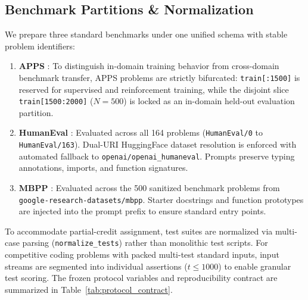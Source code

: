 \documentclass[letterpaper]{article} %
\begin{document}
\subsection{Benchmark Partitions \& Normalization}
We prepare three standard benchmarks under one unified schema with stable problem identifiers:
\begin{enumerate}
    \item \textbf{APPS} \citep{hendrycks2021apps}: To distinguish in-domain training behavior from cross-domain benchmark transfer, APPS problems are strictly bifurcated: \texttt{train[:1500]} is reserved for supervised and reinforcement training, while the disjoint slice \texttt{train[1500:2000]} ($N=500$) is locked as an in-domain held-out evaluation partition.
    \item \textbf{HumanEval} \citep{chen2021codex}: Evaluated across all 164 problems (\texttt{HumanEval/0} to \texttt{HumanEval/163}). Dual-URI HuggingFace dataset resolution is enforced with automated fallback to \texttt{openai/openai\_humaneval}. Prompts preserve typing annotations, imports, and function signatures.
    \item \textbf{MBPP} \citep{austin2021mbpp}: Evaluated across the 500 sanitized benchmark problems from \texttt{google-research-datasets/mbpp}. Starter docstrings and function prototypes are injected into the prompt prefix to ensure standard entry points.
\end{enumerate}

To accommodate partial-credit assignment, test suites are normalized via multi-case parsing (\texttt{normalize\_tests}) rather than monolithic test scripts. For competitive coding problems with packed multi-test standard inputs, input streams are segmented into individual assertions ($t \le 1000$) to enable granular test scoring. The frozen protocol variables and reproducibility contract are summarized in Table~\ref{tab:protocol_contract}.
\end{document}
